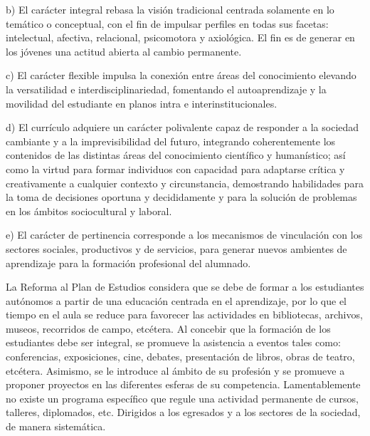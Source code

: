 b) El carácter integral rebasa la visión tradicional centrada solamente en
lo temático o conceptual, con el fin de impulsar perfiles en todas sus
facetas: intelectual, afectiva, relacional, psicomotora y axiológica. El
fin es de generar en los jóvenes una actitud abierta al cambio permanente. 


 
c) El carácter flexible impulsa la conexión entre áreas del conocimiento
elevando la versatilidad e interdisciplinariedad, fomentando el
autoaprendizaje y la movilidad del estudiante en planos intra e
interinstitucionales.

 
d) El currículo adquiere un carácter polivalente capaz de responder a la
sociedad cambiante y a la imprevisibilidad del futuro, integrando
coherentemente los contenidos de las distintas áreas del conocimiento
científico y humanístico; así como la virtud para formar individuos con
capacidad para adaptarse crítica y creativamente a cualquier contexto y
circunstancia, demostrando habilidades para la toma de decisiones oportuna
y decididamente y para la solución de problemas en los ámbitos
sociocultural y laboral. 

 
e) El carácter de pertinencia corresponde a los mecanismos de vinculación
con los sectores sociales, productivos y de servicios, para generar nuevos
ambientes de aprendizaje para la formación profesional del alumnado. 

 
La Reforma al Plan de Estudios considera que se debe de formar a los
estudiantes autónomos a partir de una educación centrada en el aprendizaje,
por lo que el tiempo en el aula se reduce para favorecer las actividades en
bibliotecas, archivos, museos, recorridos de campo, etcétera.  Al concebir
que la formación de los estudiantes debe ser integral, se promueve la
asistencia a eventos tales como: conferencias, exposiciones, cine, debates,
presentación de libros, obras de teatro, etcétera. Asimismo, se le
introduce al ámbito de su profesión y se promueve a proponer proyectos en
las diferentes esferas de su competencia. Lamentablemente no existe un
programa específico que regule una actividad permanente de cursos,
talleres, diplomados, etc. Dirigidos a los egresados y a los sectores de la
sociedad, de manera sistemática. 

